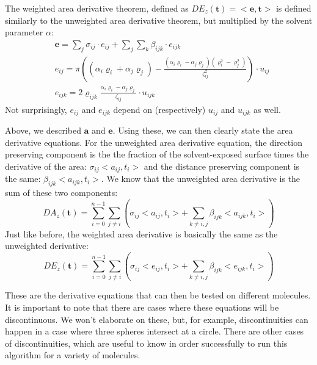 \documentclass{article}
\begin{document}
The weighted area derivative theorem, defined as $DE_z(\textbf{t}) = <\textbf{e},\textbf{t}>$ is defined similarly to the unweighted area derivative theorem, but multiplied by the solvent parameter $\alpha$:
\begin{align*}
&\textbf{e} = \sum_j \sigma_{ij}\cdot e_{ij}+ \sum_j \sum_k \beta_{ijk} \cdot e_{ijk} \\
&e_{ij} = \pi\left((\alpha_i\varrho_i +\alpha_j\varrho_j) - \frac{(\alpha_i\varrho_i  - \alpha_j \varrho_j)(\varrho_i^2 - \varrho_j^2)}{\zeta_{ij}^2}\right)\cdot u_{ij} \\
&e_{ijk} = 2\varrho_{ijk}\frac{\alpha_i\varrho_i - \alpha_j\varrho_j}{\zeta_{ij}}\cdot u_{ijk}
\end{align*}
Not surprisingly, $e_{ij}$ and $e_{ijk}$ depend on (respectively) $u_{ij}$ and $u_{ijk}$ as well.

Above, we described $\textbf{a}$ and $\textbf{e}$. Using these, we can then clearly state the area derivative equations. For the unweighted area derivative equation, the direction preserving component is the the fraction of the solvent-exposed surface times the derivative of the area: $\sigma_{ij}<a_{ij},t_i>$ and the distance preserving component is the same: $\beta_{ijk}<a_{ijk},t_i>$. We know that the unweighted area derivative is the sum of these two components:
\begin{equation}
DA_z(\textbf{t}) = \sum_{i=0}^{n-1}\sum_{j\neq i}\left(\sigma_{ij}<a_{ij},t_i> + \sum_{k\neq i,j} \beta_{ijk}<a_{ijk},t_i>\right)
\end{equation}
Just like before, the weighted area derivative is basically the same as the unweighted derivative: 
\begin{equation}
DE_z(\textbf{t}) = \sum_{i=0}^{n-1}\sum_{j\neq i}\left(\sigma_{ij}<e_{ij},t_i> + \sum_{k\neq i,j} \beta_{ijk}<e_{ijk},t_i>\right)
\end{equation}

These are the derivative equations that can then be tested on different molecules. It is important to note that there are cases where these equations will be discontinuous. We won't elaborate on these, but, for example, discontinuities can happen in a case where three spheres intersect at a circle. There are other cases of discontinuities, which are useful to know in order successfully to run this algorithm for a variety of molecules.

\end{document}
